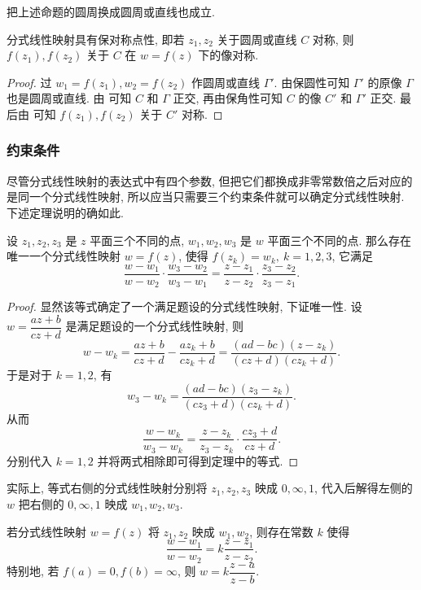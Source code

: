 把上述命题的圆周换成圆周或直线也成立.

\begin{theorem}
  分式线性映射具有保对称点性, 即若 $z_1,z_2$ 关于圆周或直线 $C$ 对称, 则 $f(z_1),f(z_2)$ 关于 $C$ 在 $w=f(z)$ 下的像对称.
\end{theorem}

\begin{proof}
  过 $w_1=f(z_1),w_2=f(z_2)$ 作圆周或直线 $\Gamma'$.
  由保圆性可知 $\Gamma'$ 的原像 $\Gamma$ 也是圆周或直线.
  由 可知 $C$ 和 $\Gamma$ 正交, 再由保角性可知 $C$ 的像 $C'$ 和 $\Gamma'$ 正交.
  最后由 可知 $f(z_1),f(z_2)$ 关于 $C'$ 对称.
\end{proof}


\subsubsection{约束条件}

尽管分式线性映射的表达式中有四个参数, 但把它们都换成非零常数倍之后对应的是同一个分式线性映射, 所以应当只需要三个约束条件就可以确定分式线性映射.
下述定理说明的确如此.

\begin{theorem}
  \label{thm:three-points-determine-fractal-transform}
  设 $z_1,z_2,z_3$ 是 $z$ 平面三个不同的点, $w_1,w_2,w_3$ 是 $w$ 平面三个不同的点.
  那么存在唯一一个分式线性映射 $w=f(z)$, 使得 $f(z_k)=w_k,\ k=1,2,3$, 它满足
  \[
     \frac{w-w_1}{w-w_2}\cdot\frac{w_3-w_2}{w_3-w_1}
    =\frac{z-z_1}{z-z_2}\cdot\frac{z_3-z_2}{z_3-z_1}.
  \]
\end{theorem}

\begin{proof}
  显然该等式确定了一个满足题设的分式线性映射, 下证唯一性.
  设 $w=\dfrac{az+b}{cz+d}$ 是满足题设的一个分式线性映射, 则
  \[
     w-w_k
    =\frac{az+b}{cz+d}-\frac{az_k+b}{cz_k+d}
    =\frac{(ad-bc)(z-z_k)}{(cz+d)(cz_k+d)}.
  \]
  于是对于 $k=1,2$, 有
  \[
    w_3-w_k=\frac{(ad-bc)(z_3-z_k)}{(cz_3+d)(cz_k+d)}.
  \]
  从而
  \[
    \frac{w-w_k}{w_3-w_k}
   =\frac{z-z_k}{z_3-z_k}\cdot\frac{cz_3+d}{cz+d}.
  \]
  分别代入 $k=1,2$ 并将两式相除即可得到定理中的等式.
\end{proof}

实际上, 等式右侧的分式线性映射分别将 $z_1,z_2,z_3$ 映成 $0,\infty,1$, 代入后解得左侧的 $w$ 把右侧的 $0,\infty,1$ 映成 $w_1,w_2,w_3$.

\begin{corollary}
  若分式线性映射 $w=f(z)$ 将 $z_1,z_2$ 映成 $w_1,w_2$, 则存在常数 $k$ 使得
  \[
    \frac{w-w_1}{w-w_2}=k\frac{z-z_1}{z-z_2}.
  \]
  特别地, 若 $f(a)=0,f(b)=\infty$, 则 $w=k\dfrac{z-a}{z-b}$.
\end{corollary}

